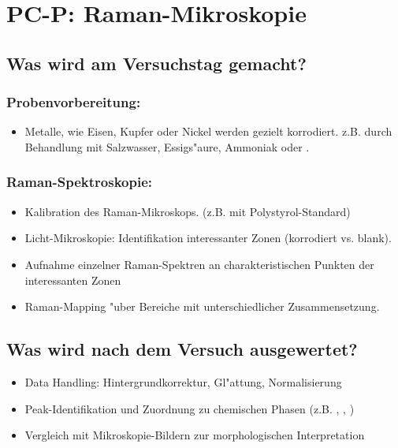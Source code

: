 \section*{PC-P: Raman-Mikroskopie}

\subsection*{Was wird am Versuchstag gemacht?}

\subsubsection*{Probenvorbereitung:} 
    \begin{itemize}
        \item Metalle, wie Eisen, Kupfer oder Nickel werden gezielt korrodiert.
         z.B. durch Behandlung mit Salzwasser, Essigs"aure, Ammoniak oder .
    \end{itemize}
\subsubsection*{Raman-Spektroskopie:}
    \begin{itemize}
        \item Kalibration des Raman-Mikroskops. (z.B. mit Polystyrol-Standard)
        \item Licht-Mikroskopie: Identifikation interessanter Zonen (korrodiert vs. blank).
        \item Aufnahme einzelner Raman-Spektren an charakteristischen Punkten der interessanten Zonen
        \item Raman-Mapping "uber Bereiche mit unterschiedlicher Zusammensetzung.
    \end{itemize}


\subsection*{Was wird nach dem Versuch ausgewertet?}

\begin{itemize}
    \item Data Handling: Hintergrundkorrektur, Gl"attung, Normalisierung
    \item Peak-Identifikation und Zuordnung zu chemischen Phasen (z.B. , , )
    \item Vergleich mit Mikroskopie-Bildern zur morphologischen Interpretation
\end{itemize}

